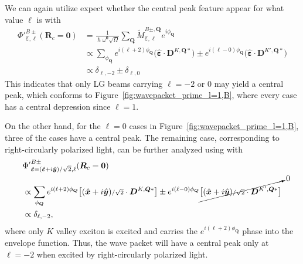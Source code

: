 We can again utilize expect whether the central peak feature appear for what value $\ell$ is with
\begin{equation}
\begin{aligned}
{\Phi'}^{B\pm}_{\hat{\boldsymbol{\varepsilon}}, \ell}(\boldsymbol{R}_c=\boldsymbol{0}) 
&=
\frac{1}{ \hslash \omega^{\boldsymbol{0}} \sqrt{\Omega}}
\sum_{\boldsymbol{Q}}
\tilde{M}_{\hat{\boldsymbol{\varepsilon}}, \ell}^{B\pm,\boldsymbol{Q}} e^{i \phi_{\boldsymbol{Q}}}\\
&\propto
\sum_{\phi_{\boldsymbol{Q}} }
e^{i(\ell + 2) \phi_{\boldsymbol{Q}}} \bigl(\hat{\boldsymbol{\varepsilon}}\cdot \boldsymbol{D}^{K, \boldsymbol{Q}*} \bigr)
\pm
e^{i(\ell - 0) \phi_{\boldsymbol{Q}}} \bigl(\hat{\boldsymbol{\varepsilon}}\cdot \boldsymbol{D}^{K', \boldsymbol{Q}*} \bigr)  \\
&\propto \delta_{\ell,-2} \pm \delta_{\ell,0}
\end{aligned}
\label{result6}
\end{equation}
This indicates that only LG beams carrying $\ell=-2 \text{ or } 0$ may yield a central peak, which conforms to Figure~\ref{fig:wavepacket_prime_l=1,B}, where every case has a central depression since $\ell=1$.

On the other hand, for the $\ell=0$ cases in Figure~\ref{fig:wavepacket_prime_l=1,B}, three of the cases have a central peak. The remaining case, corresponding to right-circularly polarized light, can be further analyzed using with
\begin{equation}
\begin{aligned}
&{\Phi'}^{B\pm}_{\hat{\boldsymbol{\varepsilon}}=(\hat{\boldsymbol{\varepsilon}}+i\hat{\boldsymbol{y}}){\scriptstyle /\sqrt{2}}, \ell}(\boldsymbol{R}_c=\boldsymbol{0}) \\
&\propto
\sum_{\phi_{\boldsymbol{Q}} }
e^{i(\ell + 2) \phi_{\boldsymbol{Q}}} \bigl[(\hat{\boldsymbol{x}}+i\hat{\boldsymbol{y}}){\scriptstyle /\sqrt{2}}\cdot \boldsymbol{D}^{K, \boldsymbol{Q}*} \bigr] \pm
e^{i(\ell - 0) \phi_{\boldsymbol{Q}}} \cancelto{0}{\bigl[(\hat{\boldsymbol{x}}+i\hat{\boldsymbol{y}}){\scriptstyle /\sqrt{2}}\cdot \boldsymbol{D}^{K', \boldsymbol{Q}*} \bigr]} \\
&\propto \delta_{\ell,-2} ,
\end{aligned}
\label{result7}
\end{equation}
where only $K$ valley exciton is excited and carries the $e^{i(\ell + 2) \phi_{\boldsymbol{Q}}}$ phase into the envelope function. Thus, the wave packet will have a central peak only at $\ell=-2$ when excited by right-circularly polarized light. 

